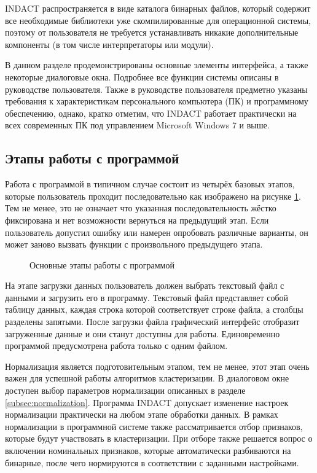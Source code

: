\documentclass[12pt]{diploma}
\begin{document}
	INDACT распространяется в виде каталога бинарных файлов, который содержит все необходимые библиотеки уже скомпилированные для операционной системы, поэтому от пользователя не требуется устанавливать никакие дополнительные компоненты (в том числе интерпретаторы или модули).
	
	В данном разделе продемонстрированы основные элементы интерфейса, а также некоторые диалоговые окна. Подробнее все функции системы описаны в руководстве пользователя. Также в руководстве пользователя предметно указаны требования к характеристикам персонального компьютера (ПК) и программному обеспечению, однако, кратко отметим, что INDACT работает практически на всех современных ПК под управлением Microsoft Windows 7 и выше. 
	
	\subsection{Этапы работы с программой}
	
	Работа с программой в типичном случае состоит из четырёх базовых этапов, которые пользователь проходит последовательно  как изображено на рисунке \ref{fig:stages}. Тем не менее, это не означает что указанная последовательность жёстко фиксирована и нет возможности вернуться на предыдущий этап. Если пользователь допустил ошибку или намерен опробовать различные варианты, он может заново вызвать функции с произвольного предыдущего этапа.
	\vspace*{1\baselineskip} 
	\begin{figure}[h!]
		\centering		
		
		\caption{Основные этапы работы с программой}
		\label{fig:stages}
	\end{figure}
	
	На этапе загрузки данных пользователь должен выбрать текстовый файл с данными и загрузить его в программу. Текстовый файл представляет собой таблицу данных, каждая строка которой соответствует строке файла, а столбцы разделены запятыми. После загрузки файла графический интерфейс отобразит загруженные данные и они станут доступны для работы. Единовременно программой предусмотрена работа только с одним файлом.
	
	Нормализация является подготовительным этапом, тем не менее, этот этап очень важен для успешной работы алгоритмов кластеризации. В диалоговом окне доступен выбор параметров нормализации описанных в разделе \ref{subsec:normalization}. Программа INDACT допускает изменение настроек нормализации практически на любом этапе обработки данных. В рамках нормализации в программной системе также рассматривается отбор признаков, которые будут участвовать в кластеризации. При отборе также решается вопрос о включении номинальных признаков, которые автоматически разбиваются на бинарные, после чего нормируются в соответствии с заданными настройками.
	
\end{document}
